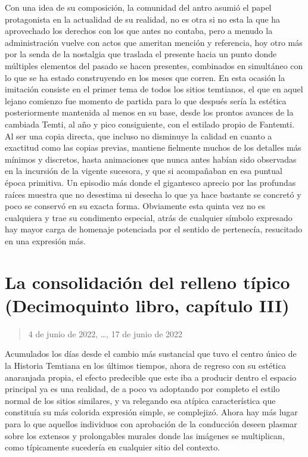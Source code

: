 \documentclass[
]{book}
\begin{document}
Con una idea de su composición, la comunidad del antro asumió el papel protagonista en la actualidad de su realidad, no es otra si no esta la que ha aprovechado los derechos con los que antes no contaba, pero a menudo la administración vuelve con actos que ameritan mención y referencia, hoy otro más por la senda de la nostalgia que traslada el presente hacia un punto donde múltiples elementos del pasado se hacen presentes, combinados en simultáneo con lo que se ha estado construyendo en los meses que corren. En esta ocasión la imitación consiste en el primer tema de todos los sitios temtianos, el que en aquel lejano comienzo fue momento de partida para lo que después sería la estética posteriormente mantenida al menos en su base, desde los prontos avances de la cambiada Temti, al año y pico consiguiente, con el estilado propio de Fantemti. Al ser una copia directa, que incluso no disminuye la calidad en cuanto a exactitud como las copias previas, mantiene fielmente muchos de los detalles más mínimos y discretos, hasta animaciones que nunca antes habían sido observadas en la incursión de la vigente sucesora, y que si acompañaban en esa puntual época primitiva. Un episodio más donde el gigantesco aprecio por las profundas raíces muestra que no desestima ni desecha lo que ya hace bastante se concretó y poco se conservó en su exacta forma. Obviamente esta quinta vez no es cualquiera y trae su condimento especial, atrás de cualquier símbolo expresado hay mayor carga de homenaje potenciada por el sentido de pertenecía, resucitado en una expresión más.

\hypertarget{la-consolidaciuxf3n-del-relleno-tuxedpico-decimoquinto-libro-capuxedtulo-iii}{%
\section{La consolidación del relleno típico (Decimoquinto libro, capítulo III)}\label{la-consolidaciuxf3n-del-relleno-tuxedpico-decimoquinto-libro-capuxedtulo-iii}}

\begin{quote}
4 de junio de 2022, \ldots, 17 de junio de 2022
\end{quote}

Acumulados los días desde el cambio más sustancial que tuvo el centro único de la Historia Temtiana en los últimos tiempos, ahora de regreso con su estética anaranjada propia, el efecto predecible que este iba a producir dentro el espacio principal ya es una realidad, de a poco va adoptando por completo el estilo normal de los sitios similares, y va relegando esa atípica característica que constituía su más colorida expresión simple, se complejizó. Ahora hay más lugar para lo que aquellos individuos con aprobación de la conducción deseen plasmar sobre los extensos y prolongables murales donde las imágenes se multiplican, como típicamente sucedería en cualquier sitio del contexto.
\end{document}

